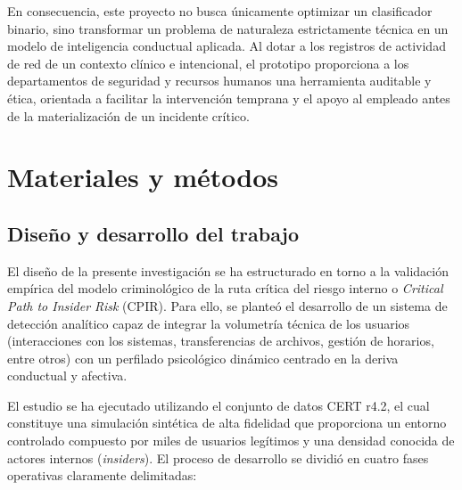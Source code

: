 \documentclass[IB]{TFUOC}%
\begin{document}
\noindent En consecuencia, este proyecto no busca únicamente optimizar un clasificador binario, sino transformar un problema de naturaleza estrictamente técnica en un modelo de inteligencia conductual aplicada. Al dotar a los registros de actividad de red de un contexto clínico e intencional, el prototipo proporciona a los departamentos de seguridad y recursos humanos una herramienta auditable y ética, orientada a facilitar la intervención temprana y el apoyo al empleado antes de la materialización de un incidente crítico.



\chapter{Materiales y métodos}

\section{Diseño y desarrollo del trabajo} 
El diseño de la presente investigación se ha estructurado en torno a la validación empírica del modelo criminológico de la ruta crítica del riesgo interno o \textit{Critical Path to Insider Risk} (CPIR). Para ello, se planteó el desarrollo de un sistema de detección analítico capaz de integrar la volumetría técnica de los usuarios (interacciones con los sistemas, transferencias de archivos, gestión de horarios, entre otros) con un perfilado psicológico dinámico centrado en la deriva conductual y afectiva.

\medskip
\noindent El estudio se ha ejecutado utilizando el conjunto de datos CERT r4.2, el cual constituye una simulación sintética de alta fidelidad que proporciona un entorno controlado compuesto por miles de usuarios legítimos y una densidad conocida de actores internos (\textit{insiders}). El proceso de desarrollo se dividió en cuatro fases operativas claramente delimitadas: 
\end{document}
